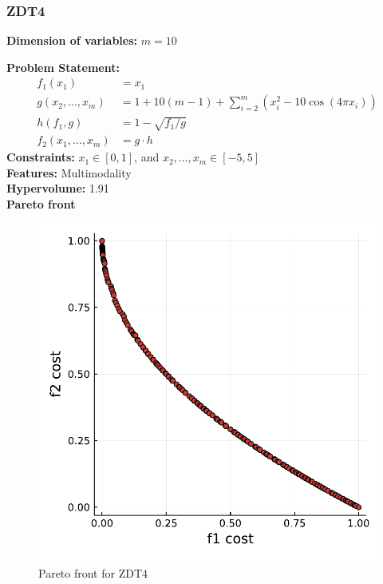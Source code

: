 \documentclass[11pt,oneside,onecolumn,openright]{article}
\begin{document}
    \subsubsection{ZDT4~\cite{huband2006review}}
   \textbf{Dimension of variables: }$m=10$

  \noindent\textbf{Problem Statement: }
  \begin{equation}
  \begin{aligned}
  f_{1}\left(x_{1}\right) & =x_{1} \\
  g\left(x_{2}, \ldots, x_{m}\right) & =1+10(m-1)+\sum_{i=2}^{m}\left(x_{i}^{2}-10 \cos \left(4 \pi x_{i}\right)\right) \\
  h\left(f_{1}, g\right) & =1-\sqrt{f_{1} / g}\\
  f_2(x_{1}, \ldots, x_{m})&=g\cdot h
  \end{aligned}
  \end{equation}
  \noindent\textbf{Constraints: } $x_{1} \in[0,1]$, and $x_{2}, \ldots, x_{m} \in[-5,5]$\\
  \noindent\textbf{Features: } Multimodality\\
  \noindent\textbf{Hypervolume: } 1.91\\
  \noindent\textbf{Pareto front}
      \begin{figure}[H]
      \centering
      \includegraphics[width=12cm]{fig/mmod.pdf}
      \cprotect\caption{Pareto front for ZDT4}
      \end{figure}
\end{document}
